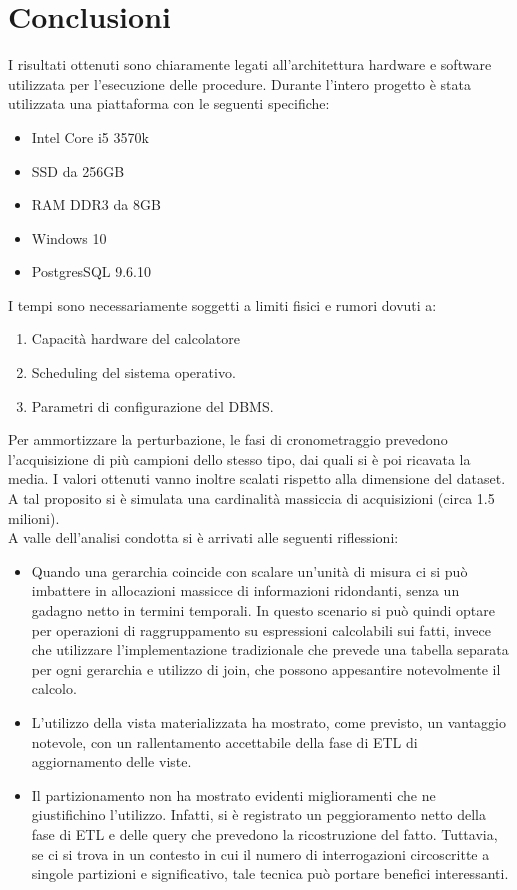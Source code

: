 \chapter{Conclusioni}
I risultati ottenuti sono chiaramente legati all'architettura hardware e software utilizzata per l'esecuzione delle procedure. Durante l'intero progetto è stata utilizzata una piattaforma con le seguenti specifiche:
\begin{itemize}
	\item Intel Core i5 3570k
	\item SSD da 256GB
	\item RAM DDR3 da 8GB
	\item Windows 10
	\item PostgresSQL 9.6.10
\end{itemize}
I tempi sono necessariamente soggetti a limiti fisici e rumori dovuti a:
\begin{enumerate}
	\item Capacità hardware del calcolatore
	\item Scheduling del sistema operativo.
	\item Parametri di configurazione del DBMS.
\end{enumerate}
Per ammortizzare la perturbazione, le fasi di cronometraggio prevedono l'acquisizione di più campioni dello stesso tipo, dai quali si è poi ricavata la media. I valori ottenuti vanno inoltre scalati rispetto alla dimensione del dataset. A tal proposito si è simulata una cardinalità massiccia di acquisizioni (circa 1.5 milioni).\\
A valle dell’analisi condotta si è arrivati alle seguenti riflessioni:

\begin{itemize}
	\item Quando una gerarchia coincide con scalare un'unità di misura ci si può imbattere in allocazioni massicce di informazioni ridondanti, senza un gadagno netto in termini temporali. In questo scenario si può quindi optare per operazioni di raggruppamento su espressioni	calcolabili sui fatti, invece che utilizzare l’implementazione tradizionale che prevede una tabella separata per ogni gerarchia e utilizzo di join, che possono appesantire notevolmente il calcolo.
	\item L’utilizzo della vista materializzata ha mostrato, come previsto, un vantaggio notevole, con un rallentamento accettabile della fase di ETL di aggiornamento delle viste.
	\item Il partizionamento non ha mostrato evidenti miglioramenti che ne giustifichino l’utilizzo. Infatti, si è registrato un peggioramento netto della fase di ETL e delle query che prevedono la ricostruzione del fatto. Tuttavia, se ci si trova in un contesto in cui il numero di interrogazioni circoscritte a singole partizioni e significativo, tale tecnica può portare benefici interessanti.
\end{itemize}